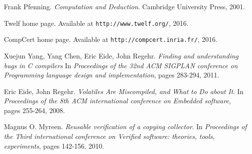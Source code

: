 \clearpage

\begin{thebibliography}{9}

Frank Pfenning.
\textit{Computation and Deduction}.
Cambridge University Press, 2001.

Twelf home page. Available at \texttt{http://www.twelf.org/}, 2016.

CompCert home page. Available at \texttt{http://compcert.inria.fr/}, 2016.

Xuejun Yang, Yang Chen, Eric Eide, John Regehr.
\textit{Finding and understanding bugs in C compilers}
In \textit{Proceedings of the 32nd ACM SIGPLAN conference on Programming language design and implementation}, pages 283-294, 2011.

Eric Eide, John Regehr.
\textit{Volatiles Are Miscompiled, and What to Do about It}.
In \textit{Proceedings of the 8th ACM international conference on Embedded software}, pages 255-264, 2008.

Magnus O. Myreen.
\textit{Reusable verification of a copying collector}.
In \textit{Proceedings of the Third international conference on Verified software: theories, tools, experiments}, pages 142-156, 2010.

\end{thebibliography}
